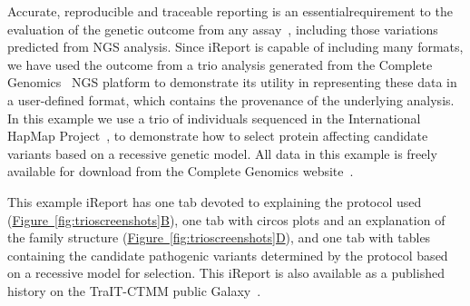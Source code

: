Accurate, reproducible and traceable reporting is an essentialrequirement to the evaluation of the genetic outcome from any assay~\cite{skyline}, including those variations predicted from NGS analysis. Since iReport is capable of including many formats, we have used the outcome from a trio analysis generated from the Complete Genomics~\cite{drmanac} NGS platform to demonstrate its utility in representing these data in a user-defined format, which contains the provenance of the underlying analysis. In this example we use a trio of individuals sequenced in the International HapMap Project~\cite{hapmap}\cite{hapmap2}, to demonstrate how to select protein affecting candidate variants based on a recessive genetic model.  All data in this example is freely available for download from the Complete Genomics website~\cite{url-CGpublicdata}.

This example iReport has one tab devoted to explaining the protocol used (\hyperref[fig:trioscreenshots]{Figure~\ref*{fig:trioscreenshots}B}), one tab with circos plots and an explanation of the family structure (\hyperref[fig:trioscreenshots]{Figure~\ref*{fig:trioscreenshots}D}), and one tab with tables containing the candidate pathogenic variants determined by the protocol based on a recessive model for selection. This iReport is also available as a published history on the TraIT-CTMM public Galaxy~\cite{url-traitgalaxy}.

